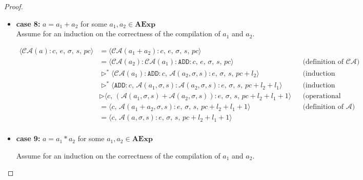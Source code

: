 \documentclass{article}
\begin{document}
\begin{proof}
\begin{itemize}
    \item \textbf{case 8: } $a = a_1 + a_2$ for some $a_1, a_2 \in \textbf{AExp}$ \\

    Assume for an induction on the correctness of the compilation of $a_1$ and $a_2$.

    \[
      \begin{aligned}
        \langle  \mathcal{CA}(a) : c,\, e,\, \sigma,\, s,\, pc \rangle 
        &= \langle \mathcal{CA}(a_1 + a_2) : c,\, e,\, \sigma,\, s,\, pc \rangle \\
        &= \langle \mathcal{CA}(a_2) : \mathcal{CA}(a_1) : \texttt{ADD} :  c,\, e,\, \sigma,\, s,\, pc \rangle 
        && \text{(definition of } \mathcal{CA}\text{)} \\
        &\triangleright^{\ast} \langle \mathcal{CA}(a_1) : \texttt{ADD} :  c,\, \mathcal{A}(a_2, \sigma, s) : e,\, \sigma,\, s,\, pc + l_2 \rangle 
        && \text{(induction hypothesis 2)} \\
        &\triangleright^{\ast} \langle \texttt{ADD} :  c,\, \mathcal{A}(a_1, \sigma, s) : \mathcal{A}(a_2, \sigma, s) : e,\, \sigma,\, s,\, pc + l_2 + l_1 \rangle 
        && \text{(induction hypothesis 1)} \\
        &\triangleright \langle c,\, (\mathcal{A}(a_1, \sigma, s) + \mathcal{A}(a_2, \sigma, s)) : e,\, \sigma,\, s,\, pc + l_2 + l_1 + 1 \rangle 
        && \text{(operational semantics)} \\
        &= \langle c,\, \mathcal{A}(a_1 + a_2, \sigma, s) : e,\, \sigma,\, s,\, pc + l_2 + l_1 + 1 \rangle
        && \text{(definition of } \mathcal{A}\text{)} \\
        &= \langle c,\, \mathcal{A}(a, \sigma, s) : e,\, \sigma,\, s,\, pc + l_2 + l_1 + 1 \rangle \\
      \end{aligned}
  \]

    \item \textbf{case 9: } $a = a_1 \ast a_2$ for some $a_1, a_2 \in \textbf{AExp}$

    Assume for an induction on the correctness of the compilation of $a_1$ and $a_2$.


\end{itemize}
\end{proof}
\end{document}
